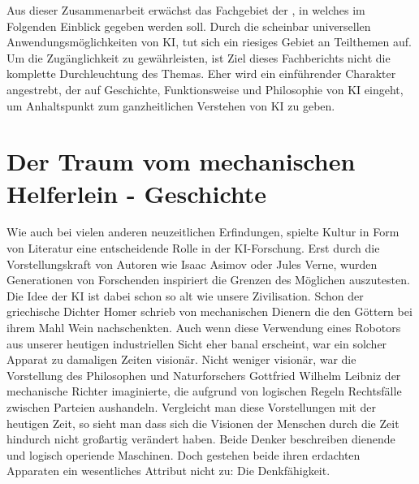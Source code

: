 \documentclass[12pt,german,ngerman]{report}
\begin{document}
    Aus dieser Zusammenarbeit erwächst das Fachgebiet der , in welches
    im Folgenden Einblick gegeben werden soll.
    Durch die scheinbar universellen Anwendungsmöglichkeiten von KI, tut sich ein riesiges Gebiet an Teilthemen auf.
    Um die Zugänglichkeit zu gewährleisten, ist Ziel dieses Fachberichts nicht die komplette Durchleuchtung
    des Themas. Eher wird ein einführender Charakter angestrebt,
    der auf Geschichte, Funktionsweise und Philosophie von KI eingeht,
    um Anhaltspunkt zum ganzheitlichen Verstehen von KI zu geben.
    

\chapter{Der Traum vom mechanischen Helferlein - Geschichte}

    Wie auch bei vielen anderen neuzeitlichen Erfindungen, spielte Kultur in Form von Literatur eine entscheidende Rolle
    in der KI-Forschung. Erst durch die Vorstellungskraft von Autoren wie Isaac Asimov
    oder Jules Verne, 
    wurden Generationen von Forschenden inspiriert die Grenzen des Möglichen auszutesten. 
    Die Idee der KI ist dabei schon so alt wie unsere Zivilisation. 
    Schon der griechische Dichter Homer schrieb von mechanischen Dienern die den Göttern bei ihrem Mahl
    Wein nachschenkten\cite[53]{buchanan2005very}. Auch wenn diese Verwendung eines Robotors aus unserer heutigen
    industriellen Sicht eher banal erscheint, war ein solcher Apparat zu damaligen Zeiten visionär.
    Nicht weniger visionär, war die Vorstellung des Philosophen und Naturforschers Gottfried Wilhelm Leibniz der mechanische
    Richter imaginierte, die aufgrund von logischen Regeln Rechtsfälle zwischen Parteien aushandeln\cite[53]{buchanan2005very}.
    Vergleicht man diese Vorstellungen mit der heutigen Zeit, so sieht man dass sich die Visionen der Menschen durch die Zeit hindurch
    nicht großartig verändert haben. Beide Denker beschreiben dienende und logisch operiende Maschinen.
    Doch gestehen beide ihren erdachten Apparaten ein wesentliches Attribut nicht zu: Die Denkfähigkeit. 
\end{document}
